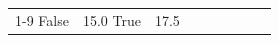 \begin{table}[H]
\begin{tabular}{lllrlllll}
\cline{1-9}
False & 15.0%
\cline{1-9}
True & 17.5%

\end{tabular}
\end{table}
